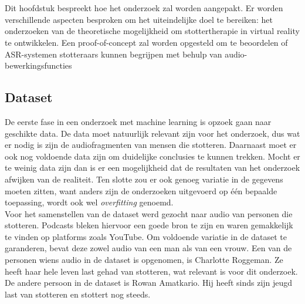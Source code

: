 
\chapter{}%
\label{ch:methodologie}


Dit hoofdstuk bespreekt hoe het onderzoek zal worden aangepakt. Er worden verschillende aspecten besproken om het uiteindelijke doel te bereiken: het onderzoeken van de theoretische mogelijkheid om stottertherapie in virtual reality te ontwikkelen. Een proof-of-concept zal worden opgesteld om te beoordelen of ASR-systemen stotteraars kunnen begrijpen met behulp van audio-bewerkingsfuncties

\section{Dataset}
De eerste fase in een onderzoek met machine learning is opzoek gaan naar geschikte data. De data moet natuurlijk relevant zijn voor het onderzoek, dus wat er nodig is zijn de audiofragmenten van mensen die stotteren. Daarnaast moet er ook nog voldoende data zijn om duidelijke conclusies te kunnen trekken. Mocht er te weinig data zijn dan is er een mogelijkheid dat de resultaten van het onderzoek afwijken van de realiteit. Ten slotte zou er ook genoeg variatie in de gegevens moeten zitten, want anders zijn de onderzoeken uitgevoerd op één bepaalde toepassing, wordt ook wel \emph{overfitting} genoemd.\\

Voor het samenstellen van de dataset werd gezocht naar audio van personen die stotteren. Podcasts bleken hiervoor een goede bron te zijn en waren gemakkelijk te vinden op platforms zoals YouTube. Om voldoende variatie in de dataset te garanderen, bevat deze zowel audio van een man als van een vrouw. Een van de personen wiens audio in de dataset is opgenomen, is Charlotte Roggeman. Ze heeft haar hele leven last gehad van stotteren, wat relevant is voor dit onderzoek. De andere persoon in de dataset is Rowan Amatkario. Hij heeft sinds zijn jeugd last van stotteren en stottert nog steeds.\\

